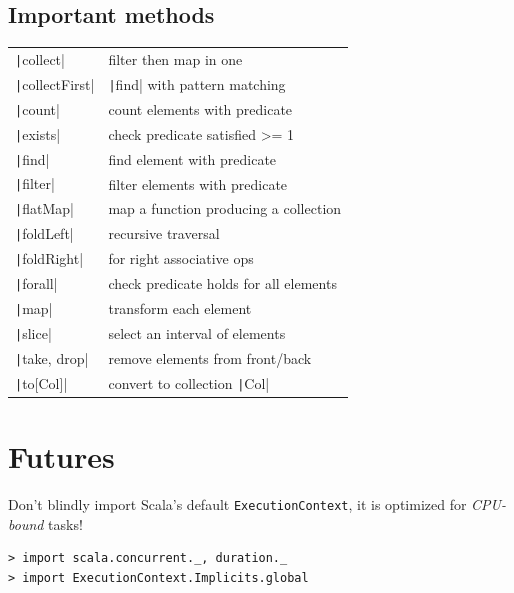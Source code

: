\documentclass[10pt,landscape,a4paper]{article}
\begin{document}
\begin{multicols*}{4}
  \subsection{Important methods}

  \begin{tabular}{l p{5cm}}
    \texttt|collect| & filter then map in one \\
    \texttt|collectFirst| & \texttt|find| with pattern matching  \\
    \texttt|count| & count elements with predicate  \\
    \texttt|exists| & check predicate satisfied >= 1 \\
    \texttt|find| & find element with predicate \\
    \texttt|filter| & filter elements with predicate \\
    \texttt|flatMap| & map a function producing a collection \\
    \texttt|foldLeft| & recursive traversal \\
    \texttt|foldRight| & for right associative ops \\
    \texttt|forall| & check predicate holds for all elements \\
    \texttt|map| & transform each element \\
    \texttt|slice| & select an interval of elements \\
    \texttt|take, drop| & remove elements from front/back \\
    \texttt|to[Col]| & convert to collection \texttt|Col|
  \end{tabular}

  \vspace*{02mm}

  \section{Futures}

  \begin{mdframed}
    \footnotesize
    Don't blindly import Scala's default \texttt{ExecutionContext}, it
    is optimized for \textit{CPU-bound} tasks!
  \end{mdframed}

\begin{verbatim}
> import scala.concurrent._, duration._
> import ExecutionContext.Implicits.global


\end{verbatim}
\end{multicols*}
\end{document}
